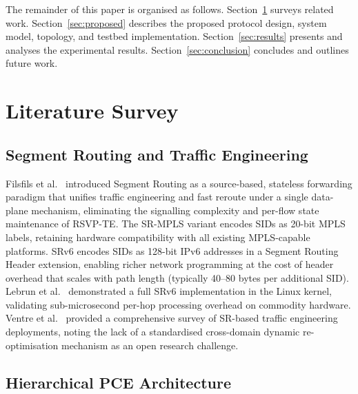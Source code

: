 \documentclass[conference]{IEEEtran}
\begin{document}
The remainder of this paper is organised as follows.
Section~\ref{sec:literature} surveys related work.
Section~\ref{sec:proposed} describes the proposed protocol design,
system model, topology, and testbed implementation.
Section~\ref{sec:results} presents and analyses the experimental
results. Section~\ref{sec:conclusion} concludes and outlines future
work.

\section{Literature Survey}
\label{sec:literature}

\subsection{Segment Routing and Traffic Engineering}

Filsfils et al.\ \cite{b_srarch} introduced Segment Routing as a
source-based, stateless forwarding paradigm that unifies traffic
engineering and fast reroute under a single data-plane mechanism,
eliminating the signalling complexity and per-flow state maintenance
of RSVP-TE. The SR-MPLS variant \cite{b_srmpls} encodes SIDs as
20-bit MPLS labels, retaining hardware compatibility with all existing
MPLS-capable platforms. SRv6 \cite{b_srv6} encodes SIDs as 128-bit
IPv6 addresses in a Segment Routing Header extension, enabling richer
network programming at the cost of header overhead that scales with
path length (typically 40--80 bytes per additional SID). Lebrun et al.\
\cite{b_srv6impl} demonstrated a full SRv6 implementation in the Linux
kernel, validating sub-microsecond per-hop processing overhead on
commodity hardware. Ventre et al.\ \cite{b_srte} provided a
comprehensive survey of SR-based traffic engineering deployments,
noting the lack of a standardised cross-domain dynamic re-optimisation
mechanism as an open research challenge.

\subsection{Hierarchical PCE Architecture}
\end{document}
